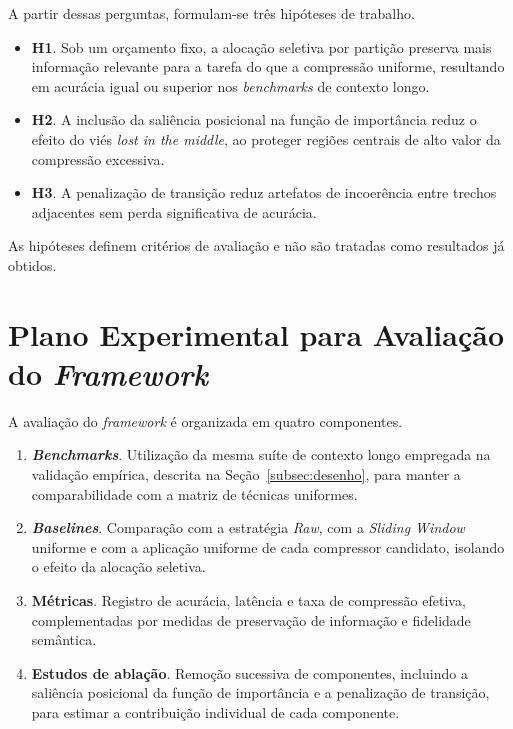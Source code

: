 A partir dessas perguntas, formulam-se três hipóteses de trabalho.

\begin{itemize}[leftmargin=1.6em]
\item \textbf{H1}. Sob um orçamento fixo, a alocação seletiva por partição preserva mais informação relevante para a tarefa do que a compressão uniforme, resultando em acurácia igual ou superior nos \textit{benchmarks} de contexto longo.

\item \textbf{H2}. A inclusão da saliência posicional na função de importância reduz o efeito do viés \textit{lost in the middle}, ao proteger regiões centrais de alto valor da compressão excessiva.

\item \textbf{H3}. A penalização de transição reduz artefatos de incoerência entre trechos adjacentes sem perda significativa de acurácia.
\end{itemize}

As hipóteses definem critérios de avaliação e não são tratadas como resultados já obtidos.

\section{Plano Experimental para Avaliação do \textit{Framework}}
\label{sec:plano-experimental}

A avaliação do \textit{framework} é organizada em quatro componentes.

\begin{enumerate}[leftmargin=1.8em]
\item \textbf{\textit{Benchmarks}}. Utilização da mesma suíte de contexto longo empregada na validação empírica, descrita na Seção~\ref{subsec:desenho}, para manter a comparabilidade com a matriz de técnicas uniformes.

\item \textbf{\textit{Baselines}}. Comparação com a estratégia \textit{Raw}, com a \textit{Sliding Window} uniforme e com a aplicação uniforme de cada compressor candidato, isolando o efeito da alocação seletiva.

\item \textbf{Métricas}. Registro de acurácia, latência e taxa de compressão efetiva, complementadas por medidas de preservação de informação e fidelidade semântica.

\item \textbf{Estudos de ablação}. Remoção sucessiva de componentes, incluindo a saliência posicional da função de importância e a penalização de transição, para estimar a contribuição individual de cada componente.
\end{enumerate}

